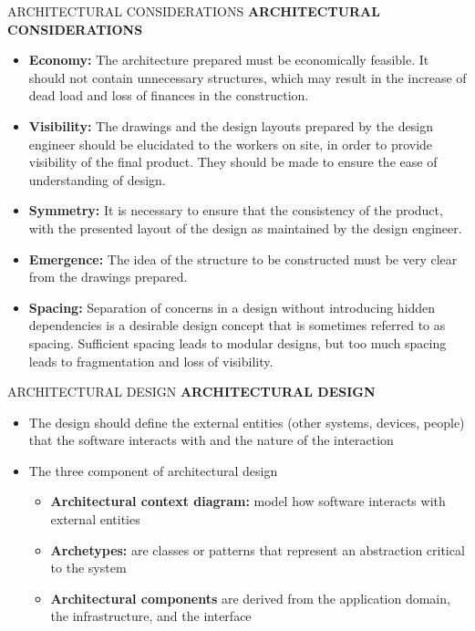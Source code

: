 \documentclass{beamer}
\begin{document}
\begin{frame}{ARCHITECTURAL CONSIDERATIONS}
	\textbf{ARCHITECTURAL CONSIDERATIONS}
		\begin{itemize}
			\item \textbf{Economy:} The architecture prepared must be economically feasible. It should not contain unnecessary structures, which may result in the increase of dead load and loss of finances in the construction.
			
			\item \textbf{Visibility:} The drawings and the design layouts prepared by the design engineer should be elucidated to the workers on site, in order to provide visibility of the final product. They should be made to ensure the ease of understanding of design.
			
			\item \textbf{Symmetry:} It is necessary to ensure that the consistency of the product, with the presented layout of the design as maintained by the design engineer.
			
			\item \textbf{Emergence:} The idea of the structure to be constructed must be very clear from the drawings prepared.
			\item \textbf{Spacing:}  Separation of concerns in a design without introducing hidden dependencies is 
			a desirable design concept that is sometimes referred to as spacing. Sufficient spacing leads 
			to modular designs, but too much spacing leads to fragmentation and loss of visibility.
		\end{itemize}
\end{frame}
\begin{frame}{ARCHITECTURAL DESIGN}
	\textbf{ARCHITECTURAL DESIGN}
	\begin{itemize}
		\item The design should define the external entities (other systems, devices, people) that the software 
		interacts with and the nature of the interaction
		\item The three component of architectural design
		\begin{itemize}
			\item \textbf{Architectural context diagram:} model how
			software interacts with external entities
			\item \textbf{Archetypes:} are classes or patterns that represent an abstraction critical to the system
			\item \textbf{Architectural components} are derived from
			the application domain, the infrastructure, and	the interface
		\end{itemize}
	\end{itemize}
\end{frame}
\end{document}
